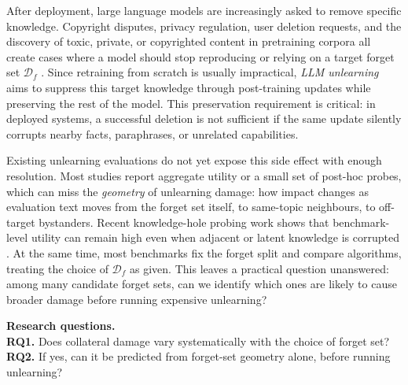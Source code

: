 \documentclass[11pt]{article}
\newcommand{\Df}{\mathcal{D}_f}
\begin{document}
After deployment, large language models are increasingly asked to remove
specific knowledge. Copyright disputes, privacy regulation, user deletion
requests, and the discovery of toxic, private, or copyrighted content in
pretraining corpora all create cases where a model should stop reproducing or
relying on a target forget set $\Df$
\citep{maini2024tofu, shi2024muse, dorna2025openunlearning}. Since retraining
from scratch is usually impractical, \emph{LLM unlearning} aims to suppress
this target knowledge through post-training updates while preserving the rest
of the model. This preservation requirement is critical: in deployed systems, a
successful deletion is not sufficient if the same update silently corrupts
nearby facts, paraphrases, or unrelated capabilities.

Existing unlearning evaluations do not yet expose this side effect with enough
resolution. Most studies report aggregate utility or a small set of post-hoc
probes, which can miss the \emph{geometry} of unlearning damage: how impact
changes as evaluation text moves from the forget set itself, to same-topic
neighbours, to off-target bystanders. Recent knowledge-hole probing work
shows that benchmark-level utility can remain high even when adjacent or latent
knowledge is corrupted \citep{ko2025probing}. At the same time, most benchmarks
fix the forget split and compare algorithms, treating the choice of $\Df$ as
given. This leaves a practical question unanswered: among many candidate forget
sets, can we identify which ones are likely to cause broader damage before
running expensive unlearning?

\begin{tcolorbox}[
    colback=gray!10, colframe=gray!50,
    arc=2mm, boxrule=0.4pt,
    left=6pt, right=6pt, top=4pt, bottom=4pt,
]
\textbf{Research questions.}\\[2pt]
\textbf{RQ1.} Does collateral damage vary systematically with the choice of forget set?\\
\textbf{RQ2.} If yes, can it be predicted from forget-set geometry alone, before running unlearning?
\end{tcolorbox}
\end{document}
